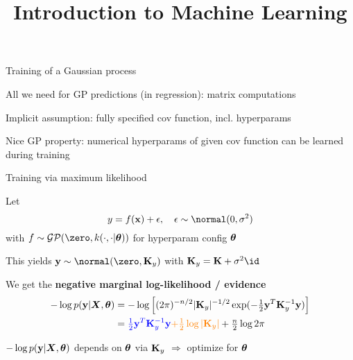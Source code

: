 \documentclass[11pt,compress,t,notes=noshow, xcolor=table]{beamer}
\title{Introduction to Machine Learning}
\begin{document}

\begin{framei}[sep=L]{Training of a Gaussian process}
\item All we need for GP predictions (in regression): matrix computations
\item Implicit assumption: fully specified cov function, incl. hyperparams
\item Nice GP property: numerical hyperparams of given cov function can be learned during training
\end{framei}

\begin{framei}[sep=L]{Training via maximum likelihood}
\item Let $$y = \fx + \epsilon, \quad \epsilon \sim \normal(0, \sigma^2)$$
with $f \sim \mathcal{GP}(\zero, k(\cdot, \cdot | \thetav))$ for hyperparam config $\bm{\theta}$
\item This yields $\yv \sim \normal(\zero, \Ky )$ with  $\Ky = \Kmat + \sigma^2 \id$
\item We get the \textbf{negative marginal log-likelihood / evidence}
\begin{eqnarray*}
-\log p(\mathbf{y} | \bm{X}, \bm{\theta}) &= -\log \left[(2 \pi )^{-n / 2} |\mathbf{K}_y|^{-1 / 2} \exp(- \tfrac{1}{2} \mathbf{y}^T \mathbf{K}_y^{-1} \mathbf{y}) \right] \\
&= \textcolor{blue}{\tfrac{1}{2} \mathbf{y}^T \mathbf{K}_y^{-1} \mathbf{y}} \textcolor{orange}{+ \tfrac{1}{2} \log | \mathbf{K}_y |}  + \tfrac{n}{2} \log 2 \pi
\end{eqnarray*}
\item $-\log p(\mathbf{y} | \bm{X}, \bm{\theta})$ depends on $\bm{\theta}$ via $\mathbf{K}_y$ $\Rightarrow$ optimize for $\bm{\theta}$
\end{framei}
\end{document}
